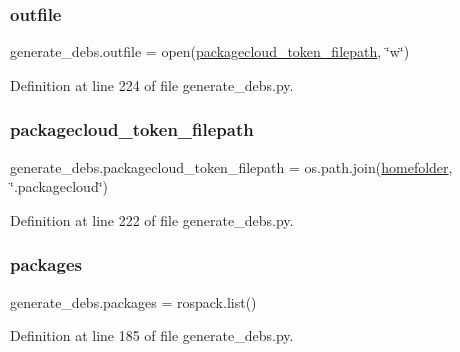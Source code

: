 \subsubsection{\texorpdfstring{outfile}{outfile}}
{\footnotesize\ttfamily generate\+\_\+debs.\+outfile = open(\hyperlink{namespacegenerate__debs_a836a20b989c3c8e46255d91d10cb524f}{packagecloud\+\_\+token\+\_\+filepath}, \char`\"{}w\char`\"{})}



Definition at line 224 of file generate\+\_\+debs.\+py.

\mbox{\label{namespacegenerate__debs_a836a20b989c3c8e46255d91d10cb524f}} 
\subsubsection{\texorpdfstring{packagecloud\+\_\+token\+\_\+filepath}{packagecloud\_token\_filepath}}
{\footnotesize\ttfamily generate\+\_\+debs.\+packagecloud\+\_\+token\+\_\+filepath = os.\+path.\+join(\hyperlink{namespacegenerate__debs_aeb83979be2939a8059435a906a91f682}{homefolder}, \char`\"{}.packagecloud\char`\"{})}



Definition at line 222 of file generate\+\_\+debs.\+py.

\mbox{\label{namespacegenerate__debs_a40d4732827c5678f3f48354238245e1d}} 
\subsubsection{\texorpdfstring{packages}{packages}}
{\footnotesize\ttfamily generate\+\_\+debs.\+packages = rospack.\+list()}



Definition at line 185 of file generate\+\_\+debs.\+py.

\mbox{\label{namespacegenerate__debs_acac340506bc1d8ca0d0881b9c00bfea2}} 
